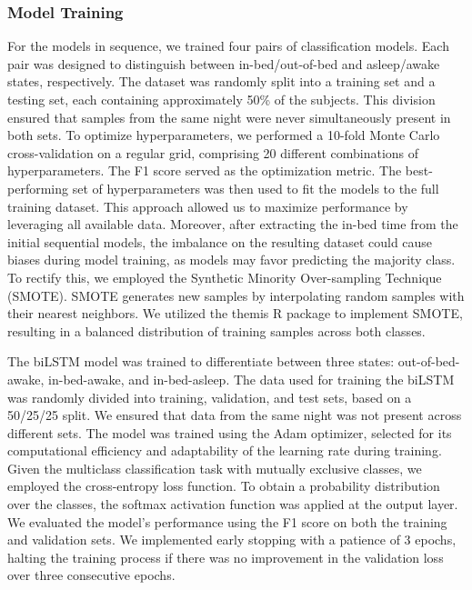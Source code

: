 \documentclass[
  super,
  preprint,
  3p]{elsarticle}
\begin{document}
\hypertarget{model-training}{%
\subsubsection{Model Training}\label{model-training}}

For the models in sequence, we trained four pairs of classification
models. Each pair was designed to distinguish between in-bed/out-of-bed
and asleep/awake states, respectively. The dataset was randomly split
into a training set and a testing set, each containing approximately
50\% of the subjects. This division ensured that samples from the same
night were never simultaneously present in both sets. To optimize
hyperparameters, we performed a 10-fold Monte Carlo cross-validation on
a regular grid, comprising 20 different combinations of hyperparameters.
The F1 score served as the optimization metric. The best-performing set
of hyperparameters was then used to fit the models to the full training
dataset. This approach allowed us to maximize performance by leveraging
all available data. Moreover, after extracting the in-bed time from the
initial sequential models, the imbalance on the resulting dataset could
cause biases during model training, as models may favor predicting the
majority class. To rectify this, we employed the Synthetic Minority
Over-sampling Technique (SMOTE)\citep{chawla2002}. SMOTE generates new
samples by interpolating random samples with their nearest neighbors. We
utilized the themis R package\citep{themis} to implement SMOTE,
resulting in a balanced distribution of training samples across both
classes.

The biLSTM model was trained to differentiate between three states:
out-of-bed-awake, in-bed-awake, and in-bed-asleep. The data used for
training the biLSTM was randomly divided into training, validation, and
test sets, based on a 50/25/25 split. We ensured that data from the same
night was not present across different sets. The model was trained using
the Adam optimizer, selected for its computational efficiency and
adaptability of the learning rate during training. Given the multiclass
classification task with mutually exclusive classes, we employed the
cross-entropy loss function. To obtain a probability distribution over
the classes, the softmax activation function was applied at the output
layer. We evaluated the model's performance using the F1 score on both
the training and validation sets. We implemented early stopping with a
patience of 3 epochs, halting the training process if there was no
improvement in the validation loss over three consecutive epochs.
\end{document}
